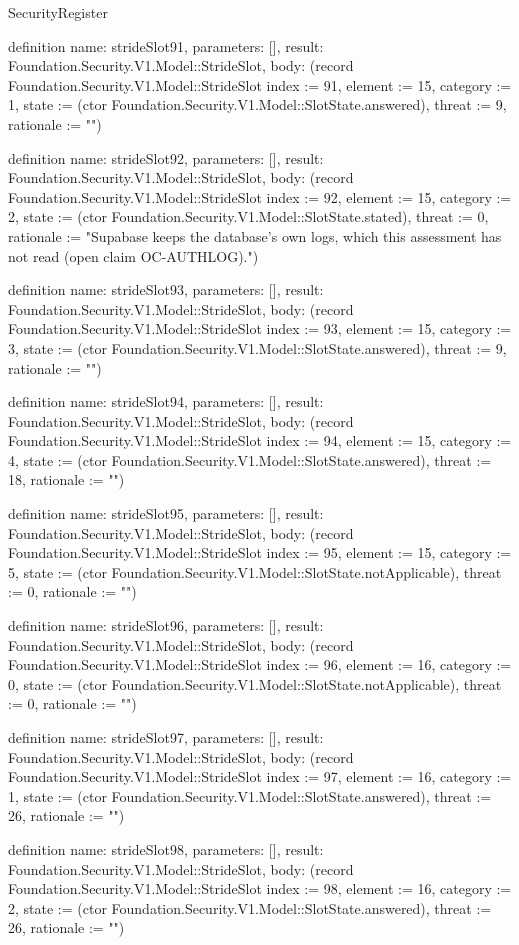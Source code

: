 \begin{lexlean}{SecurityRegister}
\begin{semanticmodule}
definition{
  name: strideSlot91,
  parameters: [],
  result: Foundation.Security.V1.Model::StrideSlot,
  body: (record Foundation.Security.V1.Model::StrideSlot {index := 91, element := 15, category := 1, state := (ctor Foundation.Security.V1.Model::SlotState.answered), threat := 9, rationale := ""})
}

definition{
  name: strideSlot92,
  parameters: [],
  result: Foundation.Security.V1.Model::StrideSlot,
  body: (record Foundation.Security.V1.Model::StrideSlot {index := 92, element := 15, category := 2, state := (ctor Foundation.Security.V1.Model::SlotState.stated), threat := 0, rationale := "Supabase keeps the database's own logs, which this assessment has not read (open claim OC-AUTHLOG)."})
}

definition{
  name: strideSlot93,
  parameters: [],
  result: Foundation.Security.V1.Model::StrideSlot,
  body: (record Foundation.Security.V1.Model::StrideSlot {index := 93, element := 15, category := 3, state := (ctor Foundation.Security.V1.Model::SlotState.answered), threat := 9, rationale := ""})
}

definition{
  name: strideSlot94,
  parameters: [],
  result: Foundation.Security.V1.Model::StrideSlot,
  body: (record Foundation.Security.V1.Model::StrideSlot {index := 94, element := 15, category := 4, state := (ctor Foundation.Security.V1.Model::SlotState.answered), threat := 18, rationale := ""})
}

definition{
  name: strideSlot95,
  parameters: [],
  result: Foundation.Security.V1.Model::StrideSlot,
  body: (record Foundation.Security.V1.Model::StrideSlot {index := 95, element := 15, category := 5, state := (ctor Foundation.Security.V1.Model::SlotState.notApplicable), threat := 0, rationale := ""})
}

definition{
  name: strideSlot96,
  parameters: [],
  result: Foundation.Security.V1.Model::StrideSlot,
  body: (record Foundation.Security.V1.Model::StrideSlot {index := 96, element := 16, category := 0, state := (ctor Foundation.Security.V1.Model::SlotState.notApplicable), threat := 0, rationale := ""})
}

definition{
  name: strideSlot97,
  parameters: [],
  result: Foundation.Security.V1.Model::StrideSlot,
  body: (record Foundation.Security.V1.Model::StrideSlot {index := 97, element := 16, category := 1, state := (ctor Foundation.Security.V1.Model::SlotState.answered), threat := 26, rationale := ""})
}

definition{
  name: strideSlot98,
  parameters: [],
  result: Foundation.Security.V1.Model::StrideSlot,
  body: (record Foundation.Security.V1.Model::StrideSlot {index := 98, element := 16, category := 2, state := (ctor Foundation.Security.V1.Model::SlotState.answered), threat := 26, rationale := ""})
}


\end{semanticmodule}
\end{lexlean}
